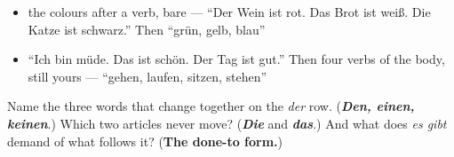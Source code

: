 \begin{itemize}
\raggedright
  \item the colours after a verb, bare — \textquotedblleft{}Der Wein ist rot. Das Brot ist weiß. Die Katze ist schwarz.\textquotedblright{} Then \textquotedblleft{}grün, gelb, blau\textquotedblright{}
  \item \textquotedblleft{}Ich bin müde. Das ist schön. Der Tag ist gut.\textquotedblright{} Then four verbs of the body, still yours — \textquotedblleft{}gehen, laufen, sitzen, stehen\textquotedblright{}
\end{itemize}

\begin{tcolorbox}[breakable,colback=teal!4,colframe=teal!35!black,title={Before you move on}]
Name the three words that change together on the \emph{der} row. (\emph{\textbf{Den, einen, keinen}}.) Which two articles never move? (\emph{\textbf{Die}} and \emph{\textbf{das}}.) And what does \emph{es gibt} demand of what follows it? (\textbf{The done-to form.})
\end{tcolorbox}
